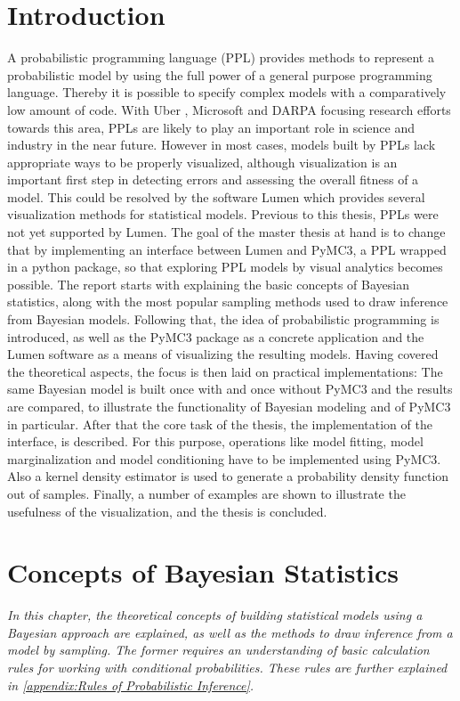 \documentclass{article}
\begin{document}
\section{Introduction}
A probabilistic programming language (PPL) provides methods to represent a probabilistic model by using the full power of a general purpose programming language. Thereby it is possible to specify complex models with a comparatively low amount of code. With Uber \cite{bingham2018pyro}, Microsoft \cite{gordon2014probabilistic} and DARPA \cite{Hardesty2015} focusing research efforts towards this area, PPLs are likely to play an important role in science and industry in the near future.
However in most cases, models built by PPLs lack appropriate ways to be properly visualized, although visualization is an important first step in detecting errors and assessing the overall fitness of a model. This could be resolved by the software Lumen which provides several visualization methods for statistical models. Previous to this thesis, PPLs were not yet supported by Lumen. The goal of the master thesis at hand is to change that by implementing an interface between Lumen and PyMC3, a PPL wrapped in a python package, so that exploring PPL models by visual analytics becomes possible. The report starts with explaining the basic concepts of Bayesian statistics, along with the most popular sampling methods used to draw inference from Bayesian models. Following that, the idea of probabilistic programming is introduced, as well as the PyMC3 package as a concrete application and the Lumen software as a means of visualizing the resulting models. Having covered the theoretical aspects, the focus is then laid on practical implementations: The same Bayesian model is built once with and once without PyMC3 and the results are compared, to illustrate the functionality of Bayesian modeling and of PyMC3 in particular. After that the core task of the thesis, the implementation of the interface, is described. For this purpose, operations like model fitting, model marginalization and model conditioning have to be implemented using PyMC3. Also a kernel density estimator is used to generate a probability density function out of samples. Finally, a number of examples are shown to illustrate the usefulness of the visualization, and the thesis is concluded.
\section{Concepts of Bayesian Statistics}
\textit{In this chapter, the theoretical concepts of building statistical models using a Bayesian approach are explained, as well as the methods to draw inference from a model by sampling. The former requires an understanding of basic calculation rules for working with conditional probabilities. These rules are further explained in  \autoref{appendix:Rules of Probabilistic Inference}.}
\end{document}
